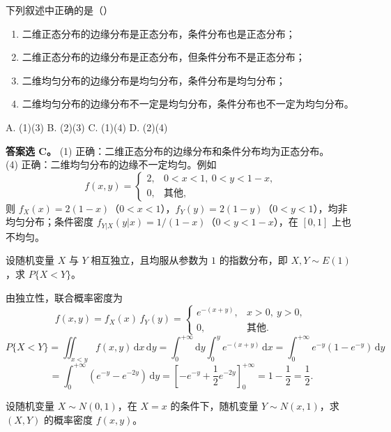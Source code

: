 \documentclass[lang=cn,11pt]{elegantbook}
\begin{document}
\begin{exercise}[二维分布的性质判断] \label{exer:3-c5b}
下列叙述中正确的是（\quad）
\begin{enumerate}
    \item[(1)] 二维正态分布的边缘分布是正态分布，条件分布也是正态分布；
    \item[(2)] 二维正态分布的边缘分布是正态分布，但条件分布不是正态分布；
    \item[(3)] 二维均匀分布的边缘分布是均匀分布，条件分布是均匀分布；
    \item[(4)] 二维均匀分布的边缘分布不一定是均匀分布，条件分布也不一定为均匀分布。
\end{enumerate}
A. (1)(3) \quad B. (2)(3) \quad C. (1)(4) \quad D. (2)(4)
\end{exercise}
\begin{solution}
\textbf{答案选 C。}
(1) 正确：二维正态分布的边缘分布和条件分布均为正态分布。\\
(4) 正确：二维均匀分布的边缘不一定均匀。例如
\[
f(x,y) = \begin{cases} 2, & 0 < x < 1,\ 0 < y < 1-x, \\ 0, & \text{其他}, \end{cases}
\]
则 $f_X(x) = 2(1-x)$（$0<x<1$），$f_Y(y) = 2(1-y)$（$0<y<1$），均非均匀分布；条件密度 $f_{Y|X}(y|x) = 1/(1-x)$（$0<y<1-x$），在 $[0,1]$ 上也不均匀。
\end{solution}

\begin{exercise}\label{exer:3-5}
设随机变量 $X$ 与 $Y$ 相互独立，且均服从参数为 $1$ 的指数分布，即 $X, Y \sim E(1)$，求 $P\{X < Y\}$。
\end{exercise}

\begin{solution}
由独立性，联合概率密度为
\[
f(x,y) = f_X(x)\,f_Y(y) = \begin{cases} e^{-(x+y)}, & x > 0,\ y > 0, \\ 0, & \text{其他}. \end{cases}
\]
\[
P\{X < Y\} = \iint_{x < y}f(x,y)\,\mathrm{d}x\,\mathrm{d}y = \int_0^{+\infty}\mathrm{d}y\int_0^y e^{-(x+y)}\,\mathrm{d}x = \int_0^{+\infty}e^{-y}(1-e^{-y})\,\mathrm{d}y
\]
\[
= \int_0^{+\infty}(e^{-y} - e^{-2y})\,\mathrm{d}y = \left[-e^{-y} + \frac{1}{2}e^{-2y}\right]_0^{+\infty} = 1 - \frac{1}{2} = \frac{1}{2}.
\]
\end{solution}

\begin{exercise}[条件正态联合密度] \label{exer:3-5b}
设随机变量 $X \sim N(0,1)$，在 $X = x$ 的条件下，随机变量 $Y \sim N(x, 1)$，求 $(X,Y)$ 的概率密度 $f(x,y)$。
\end{exercise}
\end{document}
